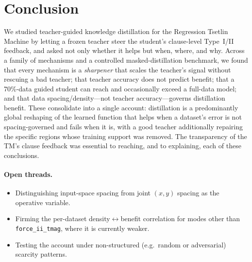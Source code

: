 \section{Conclusion}
\label{sec:conclusion}

We studied teacher-guided knowledge distillation for the Regression Tsetlin Machine by
letting a frozen teacher steer the student's clause-level Type~I/II feedback, and asked
not only whether it helps but when, where, and why. Across a family of mechanisms and a
controlled masked-distillation benchmark, we found that every mechanism is a
\emph{sharpener} that scales the teacher's signal without rescuing a bad teacher; that
teacher accuracy does not predict benefit; that a 70\%-data guided student can reach and
occasionally exceed a full-data model; and that data spacing/density---not teacher
accuracy---governs distillation benefit. These consolidate into a single account:
distillation is a predominantly global reshaping of the learned function that helps when
a dataset's error is not spacing-governed and fails when it is, with a good teacher
additionally repairing the specific regions whose training support was removed. The
transparency of the TM's clause feedback was essential to reaching, and to explaining,
each of these conclusions.

\paragraph{Open threads.}
\begin{itemize}
  \item Distinguishing input-space spacing from joint $(x,y)$ spacing as the operative
    variable.
  \item Firming the per-dataset density$\leftrightarrow$benefit correlation for modes
    other than \texttt{force\_ii\_tmag}, where it is currently weaker.
  \item Testing the account under non-structured (e.g.\ random or adversarial) scarcity
    patterns.
\end{itemize}
